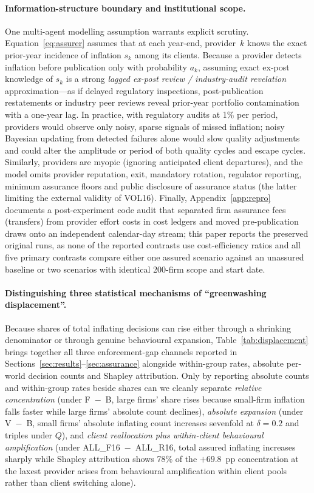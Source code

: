 \documentclass[11pt]{article}
\begin{document}
\paragraph{Information-structure boundary and institutional scope.}
One multi-agent modelling assumption warrants explicit scrutiny. Equation~\eqref{eq:assurer} assumes that at each year-end, provider~$k$ knows the exact prior-year incidence of inflation $s_k$ among its clients. Because a provider detects inflation before publication only with probability $a_k$, assuming exact ex-post knowledge of $s_k$ is a strong \emph{lagged ex-post review / industry-audit revelation} approximation---as if delayed regulatory inspections, post-publication restatements or industry peer reviews reveal prior-year portfolio contamination with a one-year lag. In practice, with regulatory audits at 1\% per period, providers would observe only noisy, sparse signals of missed inflation; noisy Bayesian updating from detected failures alone would slow quality adjustments and could alter the amplitude or period of both quality cycles and escape cycles. Similarly, providers are myopic (ignoring anticipated client departures), and the model omits provider reputation, exit, mandatory rotation, regulator reporting, minimum assurance floors and public disclosure of assurance status (the latter limiting the external validity of VOL16). Finally, Appendix~\ref{app:repro} documents a post-experiment code audit that separated firm assurance fees (transfers) from provider effort costs in cost ledgers and moved pre-publication draws onto an independent calendar-day stream; this paper reports the preserved original runs, as none of the reported contrasts use cost-efficiency ratios and all five primary contrasts compare either one assured scenario against an unassured baseline or two scenarios with identical 200-firm scope and start date.

\paragraph{Distinguishing three statistical mechanisms of ``greenwashing displacement''.}
Because shares of total inflating decisions can rise either through a shrinking denominator or through genuine behavioural expansion, Table~\ref{tab:displacement} brings together all three enforcement-gap channels reported in Sections~\ref{sec:results}--\ref{sec:assurance} alongside within-group rates, absolute per-world decision counts and Shapley attribution. Only by reporting absolute counts and within-group rates beside shares can we cleanly separate \emph{relative concentration} (under F~$-$~B, large firms' share rises because small-firm inflation falls faster while large firms' absolute count declines), \emph{absolute expansion} (under V~$-$~B, small firms' absolute inflating count increases sevenfold at $\delta = 0.2$ and triples under $Q$), and \emph{client reallocation plus within-client behavioural amplification} (under ALL\_F16~$-$~ALL\_R16, total assured inflating increases sharply while Shapley attribution shows 78\% of the $+69.8$~pp concentration at the laxest provider arises from behavioural amplification within client pools rather than client switching alone).
\end{document}
